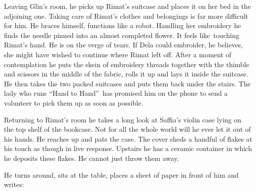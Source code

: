 \documentclass[twoside,11pt,openany]{book}
\begin{document}
Leaving Glin's room, he picks up Rimat's suitcase and places it on her bed in the adjoining one. Taking care of Rimat's
clothes and belongings is far more difficult for him. He braces himself, functions like a robot. Handling
her embroidery he finds the needle pinned into an almost completed flower. It feels like~touching Rimat's hand. He is
on the verge of tears{.}  If Dela could embroider, he believes, she might
have wished to continue where Rimat left off. After a moment of contemplation he puts the skein
of embroidery  threads together with the thimble and scissors in the middle of the fabric, rolls it up and lays it
inside the suitcase. He then takes the two packed suitcases and puts them back under the stairs. The lady who runs
``Hand to Hand''~has promised him on the phone to send a volunteer to pick them up as soon as
possible.

Returning to Rimat's room he takes a long look at Saffia's violin case lying on the top shelf of the bookcase. Not for
all{ }the whole world will he ever let it out of his hands. He reaches up and
pats the case. The cover sheds a handful of flakes at his touch as though in live response. Upstairs he has a ceramic
container in which he deposits these flakes. He cannot just throw them away.

He turns around, sits at the table, places a sheet of paper in front of him and writes:
\end{document}
